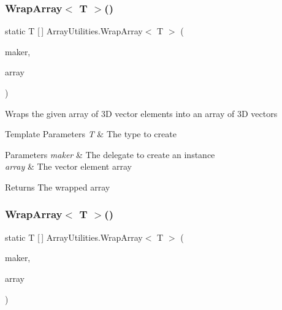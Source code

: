 \subsubsection{\texorpdfstring{Wrap\+Array$<$ T $>$()}{WrapArray< T >()}\hspace{0.1cm}{\footnotesize\ttfamily [2/3]}}
{\footnotesize\ttfamily static T \mbox{[}$\,$\mbox{]} Array\+Utilities.\+Wrap\+Array$<$ T $>$ (\begin{DoxyParamCaption}\item[{Make\+Vector3$<$ T $>$}]{maker,  }\item[{double \mbox{[}$\,$\mbox{]}}]{array }\end{DoxyParamCaption})\hspace{0.3cm}{\ttfamily [static]}}



Wraps the given array of 3D vector elements into an array of 3D vectors 


\begin{DoxyTemplParams}{Template Parameters}
{\em T} & The type to create\\
\hline
\end{DoxyTemplParams}

\begin{DoxyParams}{Parameters}
{\em maker} & The delegate to create an instance\\
\hline
{\em array} & The vector element array\\
\hline
\end{DoxyParams}
\begin{DoxyReturn}{Returns}
The wrapped array
\end{DoxyReturn}
\mbox{\label{class_array_utilities_ac8824aadee75b2f0d64903876c666d19}} 
\subsubsection{\texorpdfstring{Wrap\+Array$<$ T $>$()}{WrapArray< T >()}\hspace{0.1cm}{\footnotesize\ttfamily [3/3]}}
{\footnotesize\ttfamily static T \mbox{[}$\,$\mbox{]} Array\+Utilities.\+Wrap\+Array$<$ T $>$ (\begin{DoxyParamCaption}\item[{Make\+Color$<$ T $>$}]{maker,  }\item[{uint \mbox{[}$\,$\mbox{]}}]{array }\end{DoxyParamCaption})\hspace{0.3cm}{\ttfamily [static]}}



